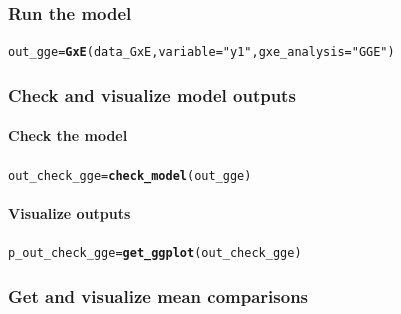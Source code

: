 \documentclass{article}\usepackage[]{graphicx}\usepackage[]{color}
\makeatletter
\newcommand{\hlstr}[1]{\textcolor[rgb]{0.192,0.494,0.8}{#1}}%
\newcommand{\hlstd}[1]{\textcolor[rgb]{0.345,0.345,0.345}{#1}}%
\newcommand{\hlkwb}[1]{\textcolor[rgb]{0.69,0.353,0.396}{#1}}%
\newcommand{\hlkwc}[1]{\textcolor[rgb]{0.333,0.667,0.333}{#1}}%
\newcommand{\hlkwd}[1]{\textcolor[rgb]{0.737,0.353,0.396}{\textbf{#1}}}%
\newenvironment{kframe}{%
 \def\at@end@of@kframe{}%
 \ifinner\ifhmode%
  \def\at@end@of@kframe{\end{minipage}}%
  \begin{minipage}{\columnwidth}%
 \fi\fi%
 \def\FrameCommand##1{\hskip\@totalleftmargin \hskip-\fboxsep
 \colorbox{shadecolor}{##1}\hskip-\fboxsep
     \hskip-\linewidth \hskip-\@totalleftmargin \hskip\columnwidth}%
 \MakeFramed {\advance\hsize-\width
   \@totalleftmargin\z@ \linewidth\hsize
   \@setminipage}}%
 {\par\unskip\endMakeFramed%
 \at@end@of@kframe}
\newenvironment{knitrout}{}{} %
\makeatother
\begin{document}
\subsubsection{Run the model}
\begin{knitrout}
\color{fgcolor}\begin{kframe}
\begin{alltt}
\hlstd{out_gge} \hlkwb{=} \hlkwd{GxE}\hlstd{(data_GxE,} \hlkwc{variable} \hlstd{=} \hlstr{"y1"}\hlstd{,} \hlkwc{gxe_analysis} \hlstd{=} \hlstr{"GGE"}\hlstd{)}
\end{alltt}


{\ttfamily\noindent\itshape\color{messagecolor}{\#\# GGE model done for y1}}\end{kframe}
\end{knitrout}

\subsubsection{Check and visualize model outputs}

\paragraph{Check the model}
\begin{knitrout}
\color{fgcolor}\begin{kframe}
\begin{alltt}
\hlstd{out_check_gge} \hlkwb{=} \hlkwd{check_model}\hlstd{(out_gge)}
\end{alltt}
\end{kframe}
\end{knitrout}

\paragraph{Visualize outputs}
\begin{knitrout}
\color{fgcolor}\begin{kframe}
\begin{alltt}
\hlstd{p_out_check_gge} \hlkwb{=} \hlkwd{get_ggplot}\hlstd{(out_check_gge)}
\end{alltt}
\end{kframe}
\end{knitrout}

\subsubsection{Get and visualize mean comparisons}
\end{document}
